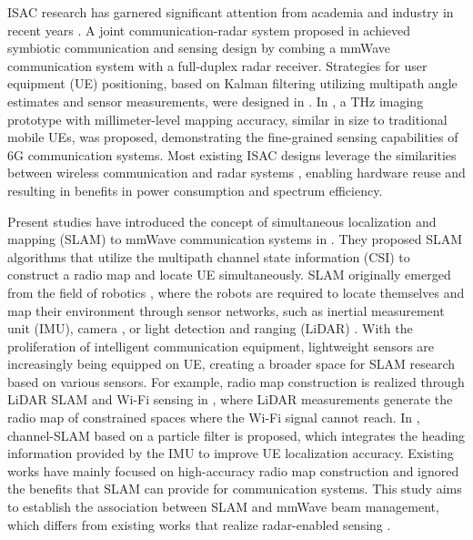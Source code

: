 \documentclass[journal,12pt,onecolumn,draftclsnofoot,]{IEEEtran}
\begin{document}
ISAC research has garnered significant attention from academia and industry in recent years \cite{a2}.
A joint communication-radar system proposed in \cite{a3} achieved symbiotic communication and sensing design by combing a mmWave communication system with a full-duplex radar receiver. 
Strategies for user equipment (UE) positioning, based on Kalman filtering utilizing multipath angle estimates and sensor measurements, were designed in \cite{a4}. In \cite{a5}, a THz imaging prototype with millimeter-level mapping accuracy, similar in size to traditional mobile UEs, was proposed, demonstrating the fine-grained sensing capabilities of 6G communication systems. 
Most existing ISAC designs leverage the similarities between wireless communication and radar systems \cite{a501, a502,a503}, enabling hardware reuse and resulting in benefits in power consumption and spectrum efficiency.

Present studies have introduced the concept of simultaneous localization and mapping (SLAM) to mmWave communication systems in \cite{a6,a601,a602}. 
They proposed SLAM algorithms that utilize the multipath channel state information (CSI) to construct a radio map and locate UE simultaneously. SLAM originally emerged from the field of robotics \cite{a7}, where the robots are required to locate themselves and map their environment through sensor networks, such as inertial measurement unit (IMU), camera \cite{a701}, or light detection and ranging (LiDAR) \cite{a702}. 
With the proliferation of intelligent communication equipment, lightweight sensors are increasingly being equipped on UE, creating a broader space for SLAM research based on various sensors. 
For example, radio map construction is realized through LiDAR SLAM and Wi-Fi sensing in \cite{a8}, where LiDAR measurements generate the radio map of constrained spaces where the Wi-Fi signal cannot reach. 
In \cite{a9}, channel-SLAM based on a particle filter is proposed, which integrates the heading information provided by the IMU to improve UE localization accuracy. 
Existing works have mainly focused on high-accuracy radio map construction and ignored the benefits that SLAM can provide for communication systems. This study aims to establish the association between SLAM and mmWave beam management, which differs from existing works that realize radar-enabled sensing \cite{a501, a502,a503}.
\end{document}
